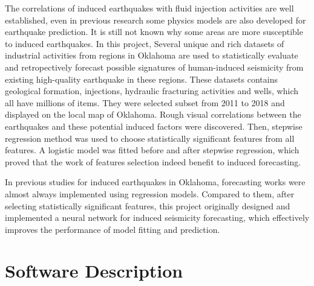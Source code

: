\documentclass[final-report]{report-template}
\begin{document}
The correlations of induced earthquakes with fluid injection activities are well established, even in previous research some physics models are also developed for earthquake prediction.
It is still not known why some areas are more susceptible to induced earthquakes.
In this project, Several unique and rich datasets of industrial activities from regions in Oklahoma are used to statistically evaluate and retropectively forecast possible signatures of human-induced seismicity from existing high-quality earthquake in these regions. 
These datasets contains geological formation, injections, hydraulic fracturing activities and wells, which all have millions of items.
They were selected subset from 2011 to 2018 and displayed on the local map of Oklahoma. Rough visual correlations between the earthquakes and these potential induced factors were discovered.
Then, stepwise regression method was used to choose statistically significant features from all features. A logistic model was fitted before and after stepwise regression, which proved that the work of features selection indeed benefit to induced forecasting. 

In previous studies for induced earthquakes in Oklahoma, forecasting works were almost always implemented using regression models. Compared to them, after selecting statistically significant features, this project originally designed and implemented a neural network for induced seismicity forecasting, which effectively improves the performance of model fitting and prediction. 

\section{Software Description}
\end{document}

